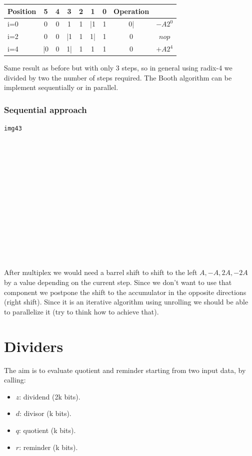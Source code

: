 \begin{center}
\begin{tabular}{|l|c|c|c|c|c|c|c|c|}
  \hline
  Position&   5&  4&  3&  2&  1&  0&   Operation\\
  \hline
  i=0&    0&  0&  1&  1&  |1& 1&  0|&   $-A2^0$\\
  i=2&    0&  0&  |1& 1&  1|& 1&  0&    $nop$\\
  i=4&    |0&  0& 1|& 1&  1&  1&  0&    $+ A 2^4$\\
  \hline
\end{tabular}
\end{center}
Same result as before but with only 3 steps, so in general using radix-4 we divided by two the number of steps required.
The Booth algorithm can be implement sequentially or in parallel.

\subsection{Sequential approach}

\begin{verbatim}
img43














\end{verbatim}

After multiplex we would need a barrel shift to shift to the left $A, -A, 2A, -2A$ by a value depending on the current step. Since we don't want to use that component we postpone the shift to the accumulator in the opposite directions (right shift). Since it is an iterative algorithm using unrolling we should be able to parallelize it (try to think how to achieve that).

\chapter{Dividers}
The aim is to evaluate quotient and reminder starting from two input data, by calling:
\begin{itemize}
  \item $z$: dividend (2k bits).
  \item $d$: divisor  (k bits).
  \item $q$: quotient (k bits).
  \item $r$: reminder  (k bits). %
\end{itemize}

